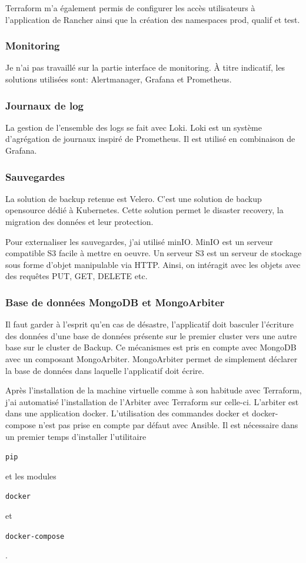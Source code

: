 \documentclass[12pt, a4paper, twoside]{article}
\begin{document}
\gls{Terraform} m'a également permis de configurer les accès utilisateurs à l'application de Rancher ainsi que la création des namespaces prod, qualif et test.

\subsubsection{Monitoring}
Je n'ai pas travaillé sur la partie interface de monitoring.
À titre indicatif, les solutions utilisées sont: Alertmanager, Grafana et Prometheus.

\subsubsection{Journaux de log}
La gestion de l'ensemble des logs se fait avec Loki.
Loki est un système d'agrégation de journaux inspiré de Prometheus.
Il est utilisé en combinaison de Grafana.

\subsubsection{Sauvegardes}
La solution de backup retenue est Velero.
C'est une solution de backup opensource dédié à \gls{Kubernetes}.
Cette solution permet le disaster recovery, la migration des données et leur protection.

Pour externaliser les sauvegardes, j'ai utilisé minIO.
MinIO est un serveur compatible S3 facile à mettre en oeuvre.
Un serveur S3 est un serveur de stockage sous forme d'objet manipulable via HTTP.
Ainsi, on intéragit avec les objets avec des requêtes PUT, GET, DELETE etc.

\subsubsection{Base de données MongoDB et MongoArbiter}
Il faut garder à l'esprit qu'en cas de désastre, l'applicatif doit basculer l'écriture des données d'une base de données présente sur le premier \gls{cluster} vers une autre base sur le \gls{cluster} de Backup.
Ce mécanismes est pris en compte avec MongoDB avec un composant MongoArbiter.
MongoArbiter permet de simplement déclarer la base de données dans laquelle l'applicatif doit écrire.

Après l'installation de la machine virtuelle comme à son habitude avec \gls{Terraform}, j'ai automatisé l'installation de l'Arbiter avec \gls{Terraform} sur celle-ci.
L'arbiter est dans une application docker.
L'utilisation des commandes docker et docker-compose n'est pas prise en compte par défaut avec \gls{Ansible}.
Il est nécessaire dans un premier temps d'installer l'utilitaire \begin{code}\texttt{pip}\end{code} et les modules \begin{code}\texttt{docker}\end{code} et \begin{code}\texttt{docker-compose}\end{code}.
\end{document}
